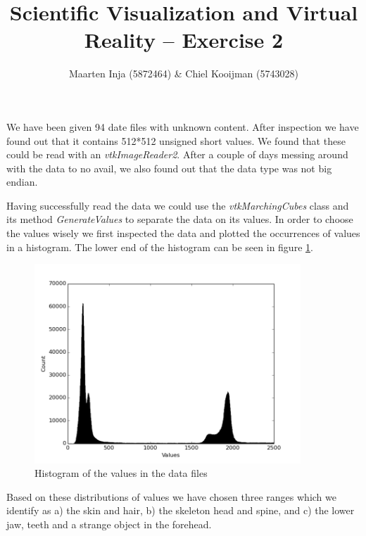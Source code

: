 \documentclass{article}[10pt]
\title{Scientific Visualization and Virtual Reality – Exercise 2}
\author{Maarten Inja (5872464) \& Chiel Kooijman (5743028)}
\begin{document}
\maketitle

We have been given 94 date files with unknown content. After inspection we have
found out that it contains 512*512 unsigned short values. We found that these
could be read with an \emph{vtkImageReader2}. After a couple of days
messing around with the data to no avail, we also found out that the data type
was not big endian.

Having successfully read the data we could use
the \emph{vtkMarchingCubes} class and its method \emph{GenerateValues}
to separate the data on its values. In order to choose the values wisely we
first inspected the data and plotted the occurrences of values in a histogram.
The lower end of the histogram can be seen in figure \ref{fig:histLow}.

\begin{figure}[h]
\centering
\includegraphics[width=10cm]{hist}
\caption{Histogram of the values in the data files}
\label{fig:histLow}
\end{figure}

Based on these distributions of values we have chosen three ranges which we
identify as a) the skin and hair, b) the skeleton head and spine, and c) the
lower jaw, teeth and a strange object in the forehead.
\end{document}
